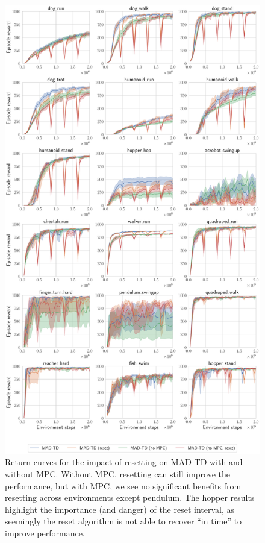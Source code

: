 \begin{figure}[H]
    \centering
    \includegraphics[width=0.8\linewidth]{figures/mad-td/mpc_reset.pdf}
    \caption{Return curves for the impact of resetting on MAD-TD with and without MPC. Without MPC, resetting can still improve the performance, but with MPC, we see no significant benefits from resetting across environments except pendulum. The hopper results highlight the importance (and danger) of the reset interval, as seemingly the reset algorithm is not able to recover ``in time'' to improve performance.}
    \label{fig:mpc_comp}
\end{figure}

